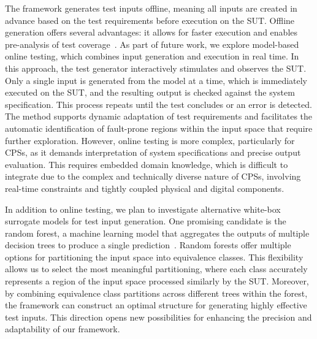 \documentclass[
]{ceurart}
\theoremstyle{definition}
\begin{document}
The framework generates test inputs offline, meaning all inputs are created in advance based on the test requirements before execution on the SUT. Offline generation offers several advantages: it allows for faster execution and enables pre-analysis of test coverage~\cite{hessel}. As part of future work, we explore model-based online testing, which combines input generation and execution in real time. In this approach, the test generator interactively stimulates and observes the SUT. Only a single input is generated from the model at a time, which is immediately executed on the SUT, and the resulting output is checked against the system specification. This process repeats until the test concludes or an error is detected. The method supports dynamic adaptation of test requirements and facilitates the automatic identification of fault-prone regions within the input space that require further exploration. However, online testing is more complex, particularly for CPSs, as it demands interpretation of system specifications and precise output evaluation. This requires embedded domain knowledge, which is difficult to integrate due to the complex and technically diverse nature of CPSs, involving real-time constraints and tightly coupled physical and digital components.

In addition to online testing, we plan to investigate alternative white-box surrogate models for test input generation. One promising candidate is the random forest, a machine learning model that aggregates the outputs of multiple decision trees to produce a single prediction~\cite{randomforest}. Random forests offer multiple options for partitioning the input space into equivalence classes. This flexibility allows us to select the most meaningful partitioning, where each class accurately represents a region of the input space processed similarly by the SUT. Moreover, by combining equivalence class partitions across different trees within the forest, the framework can construct an optimal structure for generating highly effective test inputs. This direction opens new possibilities for enhancing the precision and adaptability of our framework.




\end{document}
